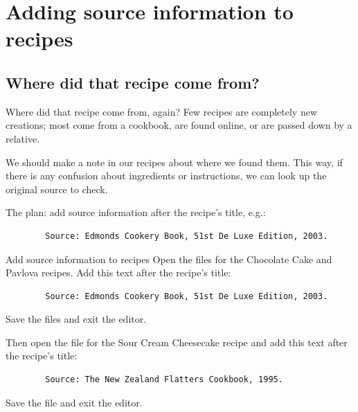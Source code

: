 \documentclass{git_course}
\begin{document}
\section{Adding source information to recipes}

\subsection{Where did that recipe come from?}

\begin{frame}[fragile]{Where did that recipe come from, again?}
    Few recipes are completely new creations; most come from a cookbook,
    are found online, or are passed down by a relative.

    We should make a note in our recipes about where we found them.  This
    way, if there is any confusion about ingredients or instructions, we can
    look up the original source to check.

    The plan: add source information after the recipe's title, e.g.:
    \begin{verbatim}
        Source: Edmonds Cookery Book, 51st De Luxe Edition, 2003.
    \end{verbatim}
\end{frame}

\begin{frame}[fragile]{Add source information to recipes}
    Open the files for the Chocolate Cake and Pavlova recipes.  Add this
    text after the recipe's title:
    \begin{verbatim}
        Source: Edmonds Cookery Book, 51st De Luxe Edition, 2003.
    \end{verbatim}

    Save the files and exit the editor.

    Then open the file for the Sour Cream Cheesecake recipe and add this
    text after the recipe's title:
    \begin{verbatim}
        Source: The New Zealand Flatters Cookbook, 1995.
    \end{verbatim}

    Save the file and exit the editor.
\end{frame}
\end{document}
